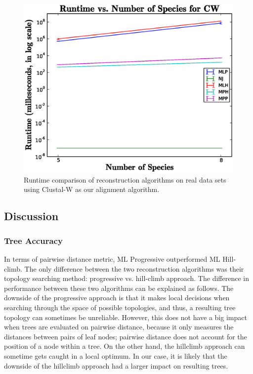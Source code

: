 \documentclass[10pt,twocolumn]{article}
\begin{document}
\begin{figure}[ht!]
\begin{centering}
  \includegraphics[scale=.45]{media/runtimeGraphs/CWreal.eps}
  \caption{Runtime comparison of reconstruction algorithms on real data sets using Clustal-W as our alignment algorithm.}
  \label{realtime}
\end{centering}
\end{figure}


\subsection*{Discussion}
\subsubsection*{Tree Accuracy}
In terms of pairwise distance metric, ML Progressive outperformed ML Hill-climb. The only difference between the two reconstruction algorithms was their topology searching method: progressive vs. hill-climb approach. The difference in performance between these two algorithms can be explained as follows. The downside of the progressive approach is that it makes local decisions when searching through the space of possible topologies, and thus, a resulting tree topology can sometimes be unreliable. However, this does not have a big impact when trees are evaluated on pairwise distance, because it only measures the distances between pairs of leaf nodes; pairwise distance does not account for the position of a node within a tree. On the other hand, the hillclimb approach can sometime gets caught in a local optimum. In our case, it is likely that the downside of the hillclimb approach had a larger impact on resulting trees. 
\end{document}

